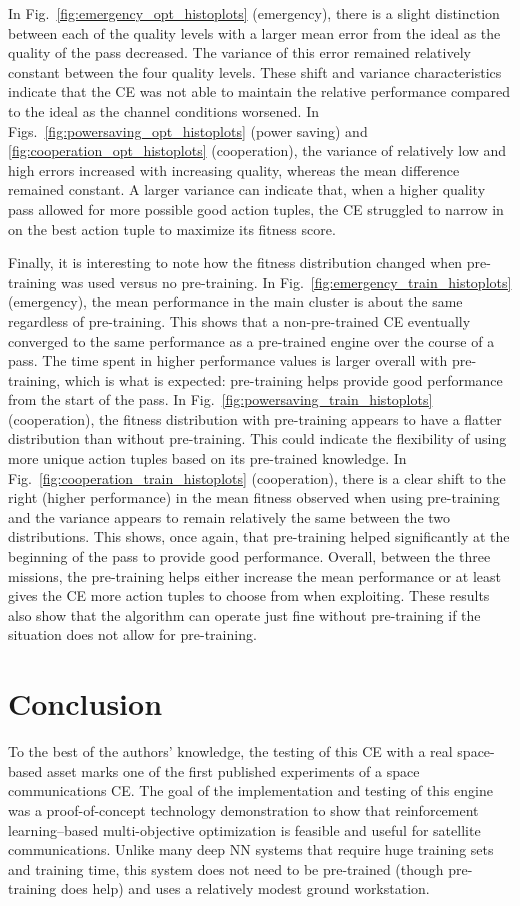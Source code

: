 \documentclass[journal]{IEEEtran}
\begin{document}
In Fig.~\ref{fig:emergency_opt_histoplots} (emergency), there is a slight distinction between each of the quality levels with a larger mean error from the ideal as the quality of the pass decreased.  The variance of this error remained relatively constant between the four quality levels.  These shift and variance characteristics indicate that the CE was not able to maintain the relative performance compared to the ideal as the channel conditions worsened.  In Figs.~\ref{fig:powersaving_opt_histoplots} (power saving) and \ref{fig:cooperation_opt_histoplots} (cooperation), the variance of relatively low and high errors increased with increasing quality, whereas the mean difference remained constant.  A larger variance can indicate that, when a higher quality pass allowed for more possible good action tuples, the CE struggled to narrow in on the best action tuple to maximize its fitness score.

Finally, it is interesting to note how the fitness distribution changed when pre-training was used versus no pre-training.  In Fig.~\ref{fig:emergency_train_histoplots} (emergency), the mean performance in the main cluster is about the same regardless of pre-training.  This shows that a non-pre-trained CE eventually converged to the same performance as a pre-trained engine over the course of a pass.  The time spent in higher performance values is larger overall with pre-training, which is what is expected: pre-training helps provide good performance from the start of the pass.  In Fig.~\ref{fig:powersaving_train_histoplots} (cooperation), the fitness distribution with pre-training appears to have a flatter distribution than without pre-training.  This could indicate the flexibility of using more unique action tuples based on its pre-trained knowledge.  In Fig.~\ref{fig:cooperation_train_histoplots} (cooperation), there is a clear shift to the right (higher performance) in the mean fitness observed when using pre-training and the variance appears to remain relatively the same between the two distributions.  This shows, once again, that pre-training helped significantly at the beginning of the pass to provide good performance.  Overall, between the three missions, the pre-training helps either increase the mean performance or at least gives the CE more action tuples to choose from when exploiting.  These results also show that the algorithm can operate just fine without pre-training if the situation does not allow for pre-training.

\section{Conclusion} \label{sec:conclusion}
To the best of the authors' knowledge, the testing of this CE with a real space-based asset marks one of the first published experiments of a space communications CE.  The goal of the implementation and testing of this engine was a proof-of-concept technology demonstration to show that reinforcement learning--based multi-objective optimization is feasible and useful for satellite communications.  Unlike many deep NN systems that require huge training sets and training time, this system does not need to be pre-trained (though pre-training does help) and uses a relatively modest ground workstation.
\end{document}
